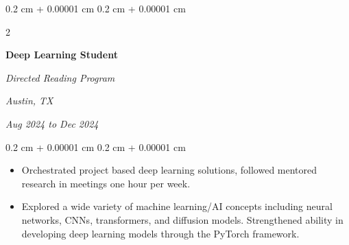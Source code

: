 \documentclass[10pt, letterpaper]{article}
\newenvironment{highlights}{
    \begin{itemize}[
        topsep=0.10 cm,
        parsep=0.10 cm,
        partopsep=0pt,
        itemsep=0pt,
        leftmargin=0.4 cm + 10pt
    ]
}{
    \end{itemize}
} %
\newenvironment{onecolentry}{
    \begin{adjustwidth}{
        0.2 cm + 0.00001 cm
    }{
        0.2 cm + 0.00001 cm
    }
}{
    \end{adjustwidth}
} %
\newenvironment{twocolentry}[2][]{
    \onecolentry
    \def\secondColumn{#2}
    \setcolumnwidth{\fill, 4.5 cm}
    \begin{paracol}{2}
}{
    \switchcolumn \raggedleft \secondColumn
    \end{paracol}
    \endonecolentry
} %
\begin{document}
        \vspace{0.2 cm}

        \begin{twocolentry}{
        \textit{Austin, TX}    
            
        \textit{Aug 2024 to Dec 2024}}
            \textbf{Deep Learning Student}
            
            \textit{Directed Reading Program}
        \end{twocolentry}

        \vspace{0.10 cm}
        \begin{onecolentry}
            \begin{highlights}
                \item Orchestrated project based deep learning solutions, followed mentored research in meetings one hour per week.
                \item Explored a wide variety of machine learning/AI concepts including neural networks, CNNs, transformers, and diffusion models. Strengthened ability in developing deep learning models through the PyTorch framework.
            \end{highlights}
        \end{onecolentry}



    
\end{document}
